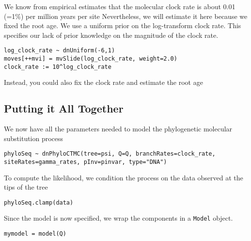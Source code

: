 We know from empirical estimates that the molecular clock rate is about  0.01 (=1\%) per million years per site
Nevertheless, we will estimate it here because we fixed the root age.
We use a uniform prior on the log-transform clock rate.
This specifies our lack of prior knowledge on the magnitude of the clock rate.
{\tt \begin{snugshade*}
\begin{lstlisting}
log_clock_rate ~ dnUniform(-6,1)
moves[++mvi] = mvSlide(log_clock_rate, weight=2.0)
clock_rate := 10^log_clock_rate
\end{lstlisting}
\end{snugshade*}}

Instead, you could also fix the clock rate and estimate the root age


\subsection{Putting it All Together}

We now have all the parameters needed to model the phylogenetic molecular substitution process

{\tt \begin{snugshade*}
\begin{lstlisting}
phyloSeq ~ dnPhyloCTMC(tree=psi, Q=Q, branchRates=clock_rate, siteRates=gamma_rates, pInv=pinvar, type="DNA")
\end{lstlisting}
\end{snugshade*}}

To compute the likelihood, we condition the process on the data observed at the tips of the tree

{\tt \begin{snugshade*}
\begin{lstlisting}
phyloSeq.clamp(data)
\end{lstlisting}
\end{snugshade*}}

Since the model is now specified, we wrap the components in a {\tt Model} object.

{\tt \begin{snugshade*}
\begin{lstlisting}
mymodel = model(Q)
\end{lstlisting}
\end{snugshade*}}


